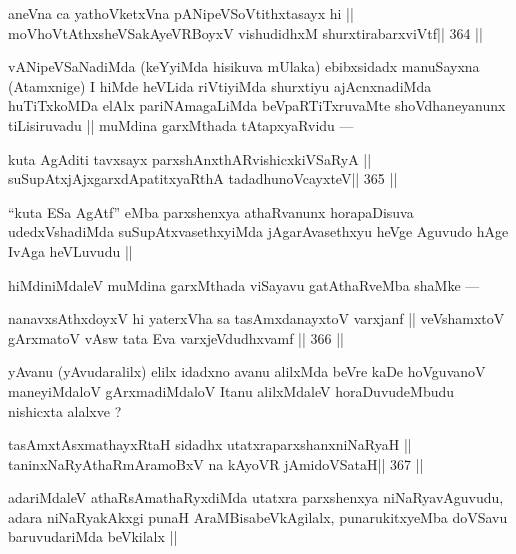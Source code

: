 \begin{shl}
aneVna ca yathoVketxVna pANipeVSoVtithxtasayx hi ||
moVhoVtAthxsheVSakAyeVRBoyxV vishudidhxM shurxtirabarxviVtf\hfill || 364 ||
\end{shl}

\begin{artha}
vANipeVSaNadiMda (keYyiMda hisikuva mUlaka) ebibxsidadx manuSayxna (Atamxnige) I hiMde heVLida riVtiyiMda shurxtiyu ajAcnxnadiMda huTiTxkoMDa elAlx pariNAmagaLiMda beVpaRTiTxruvaMte shoVdhaneyanunx tiLisiruvadu || muMdina garxMthada tAtapxyaRvidu ---
\end{artha}

\begin{shl}
kuta AgAditi tavxsayx parxshAnxthARvishicxkiVSaRyA ||
suSupAtxjAjxgarxdApatitxyaRthA tadadhunoVcayxteV\hfill || 365 ||
\end{shl}

\begin{artha}
``kuta ESa AgAtf'' eMba parxshenxya athaRvanunx horapaDisuva udedxVshadiMda suSupAtxvasethxyiMda jAgarAvasethxyu heVge Aguvudo hAge IvAga heVLuvudu ||
\end{artha}

\begin{artha}
hiMdiniMdaleV muMdina garxMthada viSayavu gatAthaRveMba shaMke ---
\end{artha}

\begin{shl}
nanavxsAthxdoyxV hi yaterxVha sa tasAmxdanayxtoV varxjanf ||
veVshamxtoV gArxmatoV vA\s sw tata Eva varxjeVdudhxvamf \hfill || 366 ||
\end{shl}

\begin{artha}
yAvanu (yAvudaralilx) elilx idadxno avanu alilxMda beVre kaDe hoVguvanoV maneyiMdaloV gArxmadiMdaloV Itanu alilxMdaleV horaDuvudeMbudu nishicxta alalxve ?
\end{artha}

\begin{shl}
tasAmxtAsxmathayxRtaH sidadhx utatxraparxshanxniNaRyaH ||
taninxNaRyAthaRmAramoBxV na kAyoVR jAmidoVSataH\hfill || 367 ||
\end{shl}

\begin{artha}
adariMdaleV athaRsAmathaRyxdiMda utatxra parxshenxya niNaRyavAguvudu, adara niNaRyakAkxgi punaH AraMBisabeVkAgilalx, punarukitxyeMba doVSavu baruvudariMda beVkilalx ||
\end{artha}


